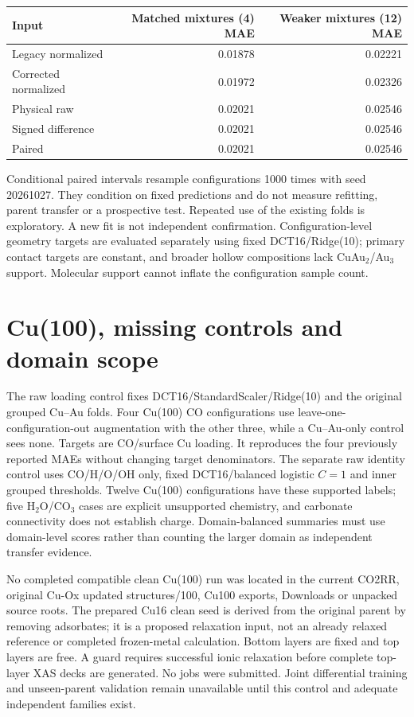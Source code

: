 \documentclass[11pt,a4paper]{article}
\begin{document}
\begin{center}\small\begin{tabular}{lrr}\toprule
Input & Matched mixtures (4) MAE & Weaker mixtures (12) MAE\\\midrule
Legacy normalized & 0.01878 & 0.02221\\
Corrected normalized & 0.01972 & 0.02326\\
Physical raw & 0.02021 & 0.02546\\
Signed difference & 0.02021 & 0.02546\\
Paired & 0.02021 & 0.02546\\
\bottomrule\end{tabular}\end{center}
Conditional paired intervals resample configurations 1000 times with seed 20261027. They condition on fixed predictions and do not measure refitting, parent transfer or a prospective test. Repeated use of the existing folds is exploratory. A new fit is not independent confirmation. Configuration-level geometry targets are evaluated separately using fixed DCT16/Ridge(10); primary contact targets are constant, and broader hollow compositions lack CuAu$_2$/Au$_3$ support. Molecular support cannot inflate the configuration sample count.

\section{Cu(100), missing controls and domain scope}
The raw loading control fixes DCT16/StandardScaler/Ridge(10) and the original grouped Cu--Au folds. Four Cu(100) CO configurations use leave-one-configuration-out augmentation with the other three, while a Cu--Au-only control sees none. Targets are CO/surface Cu loading. It reproduces the four previously reported MAEs without changing target denominators. The separate raw identity control uses CO/H/O/OH only, fixed DCT16/balanced logistic $C=1$ and inner grouped thresholds. Twelve Cu(100) configurations have these supported labels; five H$_2$O/CO$_3$ cases are explicit unsupported chemistry, and carbonate connectivity does not establish charge. Domain-balanced summaries must use domain-level scores rather than counting the larger domain as independent transfer evidence.

No completed compatible clean Cu(100) run was located in the current CO2RR, original Cu-Ox updated structures/100, Cu100 exports, Downloads or unpacked source roots. The prepared Cu16 clean seed is derived from the original parent by removing adsorbates; it is a proposed relaxation input, not an already relaxed reference or completed frozen-metal calculation. Bottom layers are fixed and top layers are free. A guard requires successful ionic relaxation before complete top-layer XAS decks are generated. No jobs were submitted. Joint differential training and unseen-parent validation remain unavailable until this control and adequate independent families exist.
\end{document}
